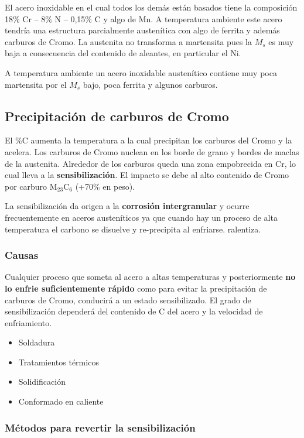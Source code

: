 El acero inoxidable en el cual todos los demás están basados tiene la composición 18\% Cr -- 8\% N -- 0,15\% C y algo de Mn. A temperatura ambiente este acero tendría una estructura parcialmente austenítica con algo de ferrita y además carburos de Cromo. La austenita no transforma a martensita pues la $M_s$ es muy baja a consecuencia del contenido de aleantes, en particular el Ni.

A temperatura ambiente un acero inoxidable austenítico contiene muy poca martensita por el $M_s$ bajo, poca ferrita y algunos carburos.

\subsection{Precipitación de carburos de Cromo}
\label{ssec:sensibilizacion}
El \%C aumenta la temperatura a la cual precipitan los carburos del Cromo y la acelera. Los carburos de Cromo nuclean en los borde de grano y bordes de maclas de la austenita. Alrededor de los carburos queda una zona empobrecida en Cr, lo cual lleva a la \textbf{sensibilización}. El impacto se debe al alto contenido de Cromo por carburo M$_{23}$C$_6$ (+70\% en peso).

La sensibilización da origen a la \textbf{corrosión intergranular} y ocurre frecuentemente en aceros austeníticos ya que cuando hay un proceso de alta temperatura el carbono se disuelve y re-precipita al enfriarse.
ralentiza. 

\subsubsection{Causas}
Cualquier proceso que someta al acero a altas temperaturas y posteriormente \textbf{no lo enfrie suficientemente rápido} como para evitar la precipitación de carburos de Cromo, conducirá a un estado sensibilizado. El grado de sensibilización dependerá del contenido de C del acero y la velocidad de enfriamiento.

\begin{itemize}
	\item Soldadura
	\item Tratamientos térmicos
	\item Solidificación
	\item Conformado en caliente
\end{itemize}

\subsubsection{Métodos para revertir la sensibilización}

